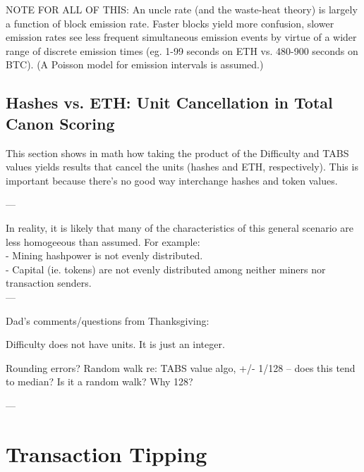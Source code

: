 \documentclass[11pt]{article}
\theoremstyle{plain}
\begin{document}
NOTE FOR ALL OF THIS:
An uncle rate (and the waste-heat theory) is largely a function of block
emission rate.
Faster blocks yield more confusion, slower emission rates see less frequent
simultaneous emission events by virtue of a wider range of discrete emission
times (eg. 1-99 seconds on ETH vs. 480-900 seconds on BTC). (A Poisson model
for emission intervals is assumed.)



\subsection{\small{Hashes vs. ETH: Unit Cancellation in Total Canon
Scoring}}\label{sec: S1}

This section shows in math how taking the product of the Difficulty and TABS
values
yields results that cancel the units (hashes and ETH, respectively). This is
important because there's no good way interchange hashes and token values.

---

In reality, it is likely that many of the characteristics of this general
scenario are less homogeeous than assumed.
For example: \\
- Mining hashpower is not evenly distributed. \\
- Capital (ie. tokens) are not evenly distributed among neither miners nor
transaction senders. \\

---

Dad's comments/questions from Thanksgiving:

Difficulty does not have units. It is just an integer.

Rounding errors?
Random walk re: TABS value algo, +/- 1/128 -- does this tend to median? Is it a
random walk?
Why 128?

---
\appendix

\section{\normalsize{Transaction Tipping}}
\label{Transaction Tipping}
\end{document}
